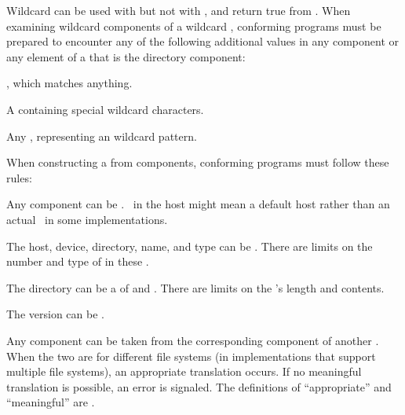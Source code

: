 \endsubsubsection%


  Wildcard  can be used with  but not with 
  ,
  and return true from . When examining
  wildcard components of a wildcard , conforming programs
  must be prepared to encounter any of the following additional values
  in any component or any element of a  that is the directory component:
 
\beginlist

\itemitem{\bull}
  , which matches anything.
 
\itemitem{\bull}
  A  containing  special wildcard
  characters.
 
\itemitem{\bull}
  Any , representing an  wildcard
  pattern.

\endlist 

\endsubsubsection%


  When constructing a  from components, conforming programs
  must follow these rules:
  
\beginlist

\itemitem{\bull}
  Any component can be \nil.  \nil\ in the host might mean a default host
  rather than an actual \nil\ in some implementations.
           
\itemitem{\bull}
  The host, device, directory, name, and type can be .  There
  are  limits on the number and type of
   in these .
  
\itemitem{\bull}
  The directory can be a  of  and .
  There are  limits on the 's
  length and contents.
  
\itemitem{\bull}
The version can be .
 
\itemitem{\bull}
Any component can be taken from the corresponding component
    of another .  When 
the two  are for different
    file systems (in implementations that support multiple file
    systems), an appropriate translation occurs.  If no meaningful
    translation is possible, an error is signaled.  The definitions
    of ``appropriate'' and ``meaningful'' are .
  
